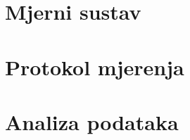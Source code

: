 \documentclass[../diplomski_rad.tex]{subfiles}
\begin{document}
\sloppy

\justifying

\section{Mjerni sustav}

\section{Protokol mjerenja}

\section{Analiza podataka}
\end{document}
